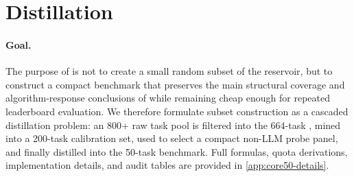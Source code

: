 
\section{\core{} Distillation}
\label{sec:core50-distillation}

\paragraph{Goal.}
The purpose of \core{} is not to create a small random subset of the reservoir, but to construct a compact benchmark that preserves the main structural coverage and algorithm-response conclusions of \reservoir{} while remaining cheap enough for repeated leaderboard evaluation. We therefore formulate subset construction as a cascaded distillation problem: an 800+ raw task pool is filtered into the 664-task \reservoir{}, mined into a 200-task calibration set, used to select a compact non-LLM probe panel, and finally distilled into the 50-task \core{} benchmark. Full formulas, quota derivations, implementation details, and audit tables are provided in \cref{app:core50-details}.

